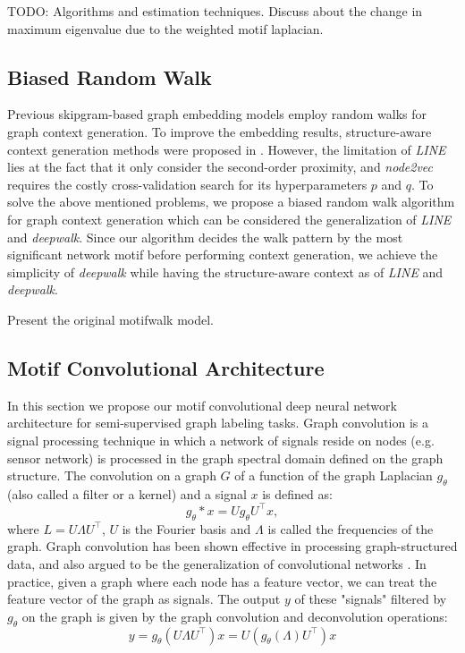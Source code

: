 \documentclass{article}
\theoremstyle{definition}
\begin{document}
TODO: Algorithms and estimation techniques. Discuss about
the change in maximum eigenvalue due to the weighted
motif laplacian.

\subsection{Biased Random Walk}

Previous skipgram-based graph embedding models employ random
walks for graph context generation. To improve the embedding results,
structure-aware context generation methods were proposed in \cite{line,node2vec}.
However, the limitation of \emph{LINE} lies at the fact that it only
consider the second-order proximity, and \emph{node2vec} requires
the costly cross-validation search for its hyperparameters $p$ and $q$.
To solve the above mentioned problems, we propose a biased random walk
algorithm for graph context generation which can be considered the 
generalization of \emph{LINE} and \emph{deepwalk}. Since our algorithm
decides the walk pattern by the most significant network motif before 
performing context generation, we achieve the simplicity of \emph{deepwalk}
while having the structure-aware context as of \emph{LINE} and \emph{deepwalk}.

Present the original motifwalk model.

\subsection{Motif Convolutional Architecture}

In this section we propose our motif convolutional deep
neural network architecture for semi-supervised graph labeling
tasks. Graph convolution is a signal processing technique in which
a network of signals reside on nodes (e.g. sensor network) is
processed in the graph spectral domain defined on the graph structure.
The convolution on a graph $G$ of a function of the graph Laplacian $g_{\theta}$ 
(also called a filter or a kernel) and a signal $x$ is defined as:
$$g_{\theta} \ast x = U g_{\theta} U^{\top} x,$$
where $L = U \Lambda U^\top$, $U$ is the Fourier basis
and $\Lambda$ is called the frequencies of the graph. 
Graph convolution has been shown effective in processing
graph-structured data, and also argued to be the generalization
of convolutional networks \cite{shuman2013emerging,defferrard2016convolutional,gcn}.
In practice, given a graph where each node has a feature vector,
we can treat the feature vector of the graph as signals. The output $y$
of these "signals" filtered by $g_\theta$ on the graph is given by
the graph convolution and deconvolution operations: 
\begin{equation}
\label{eq:1}
y = g_\theta (U \Lambda U^\top) x = U (g_\theta(\Lambda) U^\top)x
\end{equation}
\end{document}
